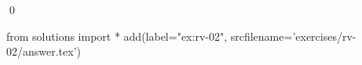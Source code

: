 
\begin{ex} 
  \label{ex:rv-02}
  
  \qed
\end{ex} 
\begin{python0}
from solutions import *
add(label="ex:rv-02",
    srcfilename='exercises/rv-02/answer.tex') 
\end{python0}
